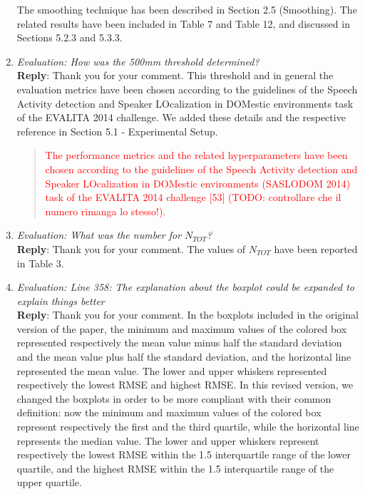 \documentclass[11pt, technote, letterpaper, oneside, onecolumn]{IEEEtran}
\begin{document}
\begin{enumerate}
The smoothing technique has been described in Section 2.5 (Smoothing). The related results have been included in Table 7 and Table 12, and discussed in Sections 5.2.3 and 5.3.3.

\item \textit{Evaluation: How was the 500mm threshold determined?\\}
\textbf{Reply}: Thank you for your comment. This threshold and in general the evaluation metrics have been chosen according to the guidelines of the Speech Activity detection and Speaker LOcalization in DOMestic environments task of the EVALITA 2014 challenge. We added these details and the respective reference in Section 5.1 - Experimental Setup.
\begin{quote}
	\textcolor{red}{The performance metrics and the related hyperparameters have been chosen according to the guidelines of the Speech Activity detection and Speaker LOcalization in DOMestic environments (SASLODOM 2014) task of the EVALITA 2014 challenge [53] (TODO: controllare che il numero rimanga lo stesso!).}
\end{quote}

\item \textit{Evaluation: What was the number for $N_{TOT}$?\\}
\textbf{Reply}: Thank you for your comment. The values of $N_{TOT}$ have been reported in Table 3.

\item \textit{Evaluation: Line 358: The explanation about the boxplot could be expanded to explain things better\\}
\textbf{Reply}: Thank you for your comment. In the boxplots included in the original version of the paper,  the minimum and maximum values of the colored box represented respectively the mean value minus half the standard deviation and the mean value plus half the standard deviation, and the horizontal line represented the mean value. The lower and upper whiskers represented respectively the lowest RMSE and highest RMSE. In this revised version, we changed the boxplots in order to be more compliant with their common definition: now the minimum and maximum values of the colored box represent respectively the first and the third quartile, while the horizontal line represents the median value. The lower and upper whiskers represent respectively the lowest RMSE within the 1.5 interquartile range of the lower quartile, and the highest RMSE within the 1.5 interquartile range of the upper quartile.


\end{enumerate}
\end{document}
